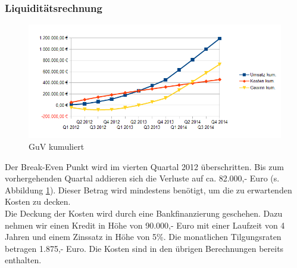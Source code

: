 \subsubsection*{Liquiditätsrechnung}
\begin{figure}[htbp]
	\centering
	\includegraphics[width=1\textwidth]{GuVkummuliert.png}
	\caption{GuV kumuliert}
	\label{picGuVkum}
\end{figure}

Der Break-Even Punkt wird im vierten Quartal 2012 überschritten. Bis zum vorhergehenden Quartal addieren sich die Verluste auf ca{.} 82.000,- Euro (s. Abbildung \ref{picGuVkum}). Dieser Betrag wird mindestens benötigt, um die zu erwartenden Kosten zu decken.\\
Die Deckung der Kosten wird durch eine Bankfinanzierung geschehen. Dazu nehmen wir einen Kredit in Höhe von 90.000,- Euro mit einer Laufzeit von 4 Jahren und einem Zinssatz in Höhe von 5\%. Die monatlichen Tilgungsraten betragen 1.875,- Euro. Die Kosten sind in den übrigen Berechnungen bereits enthalten.
